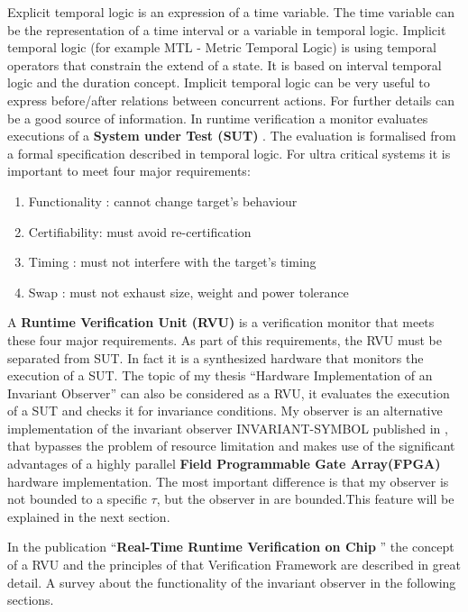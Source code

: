 Explicit temporal logic is an expression of a time variable. The time variable can be the representation of a time interval or a variable in temporal logic. 
Implicit temporal logic (for example MTL - Metric Temporal Logic) is using temporal operators that constrain the extend of a state.
It is based on interval temporal logic and the duration concept.
Implicit temporal logic can be very useful to express before/after relations between concurrent actions.
For further details \cite{210306} can be a good source of information.
In runtime verification a monitor evaluates executions of a \textbf{System under Test (SUT)} \cite{RTFMBJ13}. 
The evaluation is formalised from a formal specification described in temporal logic.\newpage
For ultra critical systems it is important to meet four major requirements:
\begin{enumerate}
 \item Functionality : cannot change target's behaviour
 \item Certifiability: must avoid re-certification
 \item Timing :	  must not interfere with the target's timing
 \item Swap :     must not exhaust size, weight and power tolerance
\end{enumerate}

A \textbf{Runtime Verification Unit (RVU)} is a verification monitor that meets these four major requirements.
As part of this requirements, the RVU must be separated from SUT.
In fact it is a synthesized hardware that monitors the execution of a SUT.\newline
The topic of my thesis ``Hardware Implementation of an Invariant Observer'' can also be considered as a RVU, 
it evaluates the execution of a SUT and checks it for invariance conditions.
My observer is an alternative  implementation of the invariant observer INVARIANT-SYMBOL published in \cite{RTFMBJ13},
that bypasses the problem of resource limitation and makes use of the significant advantages of a highly parallel
\textbf{Field Programmable Gate Array(FPGA)} hardware implementation.
The most important difference is that my observer is not bounded to a specific $\tau$, but the observer in \cite{RTFMBJ13}
are bounded.This feature will be explained in the next section.

In the publication ``\textbf{Real-Time Runtime Verification on Chip} '' \cite{RTFMBJ13} the concept of a RVU and 
the principles of that Verification Framework are described in great detail.\newline\newline
A survey about the functionality of the invariant observer in the following sections.




